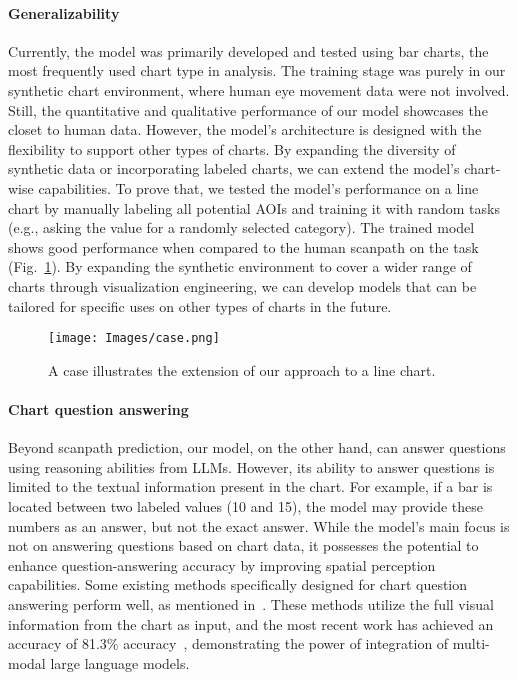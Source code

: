 \paragraph{Generalizability}
Currently, the model was primarily developed and tested using bar charts, the most frequently used chart type in analysis.
The training stage was purely in our synthetic chart environment, where human eye movement data were not involved.
Still, the quantitative and qualitative performance of our model showcases the closet to human data.
However, the model's architecture is designed with the flexibility to support other types of charts. By expanding the diversity of synthetic data or incorporating labeled charts, we can extend the model's chart-wise capabilities.
To prove that, we tested the model's performance on a line chart by manually labeling all potential AOIs and training it with random tasks (e.g., asking the value for a randomly selected category). The trained model shows good performance when compared to the human scanpath on the task (Fig.~\ref{fig:case}). By expanding the synthetic environment to cover a wider range of charts through visualization engineering, we can develop models that can be tailored for specific uses on other types of charts in the future.

\begin{figure}[!h]
\centering
  \texttt{[image: Images/case.png]}
  \caption{A case illustrates the extension of our approach to a line chart.}
  \label{fig:case}
\end{figure}

\paragraph{Chart question answering}
Beyond scanpath prediction, our model, on the other hand, can answer questions using reasoning abilities from LLMs. However, its ability to answer questions is limited to the textual information present in the chart. For example, if a bar is located between two labeled values (10 and 15), the model may provide these numbers as an answer, but not the exact answer. 
While the model's main focus is not on answering questions based on chart data, it possesses the potential to enhance question-answering accuracy by improving spatial perception capabilities.
Some existing methods specifically designed for chart question answering perform well, as mentioned in~\cite{masry2022chartqa}. These methods utilize the full visual information from the chart as input, and the most recent work has achieved an accuracy of 81.3\% accuracy~\cite{cuarbune2024chart}, demonstrating the power of integration of multi-modal large language models.

